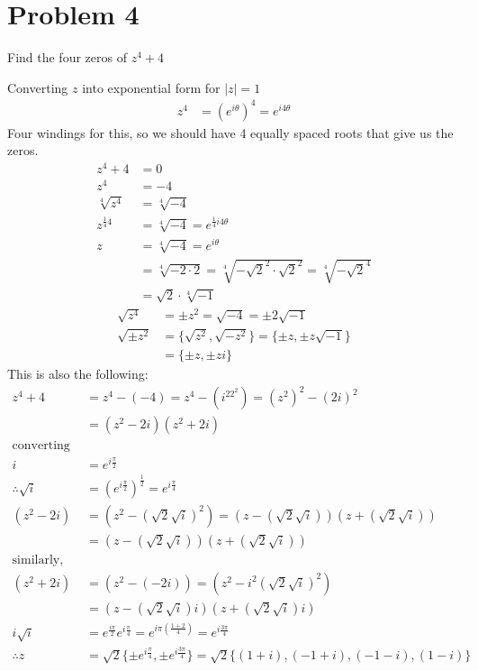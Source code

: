 \documentclass{article}
\begin{document}
\newpage

\section*{Problem 4}
Find the four zeros of $z^4+4$

Converting $z$ into exponential form for $|z| = 1$
 \begin{align*}
 z^4 &= (e^{i\theta})^4 = e^{i4\theta}
 \end{align*}
 Four windings for this, so we should have 4 equally spaced roots that give us the zeros.
 \begin{align*}
   z^4+4 &= 0\\
   z^4 &= -4\\
   \sqrt[4]{z^4} &= \sqrt[4]{-4}\\
   z^{\frac{1}{4}4} &= \sqrt[4]{-4} = e^{\frac{1}{4}i4\theta}\\
   z &= \sqrt[4]{-4} = e^{i\theta}\\
         &= \sqrt[4]{-2\cdot 2} = \sqrt[4]{-\sqrt{2}^2\cdot \sqrt{2}^2} = \sqrt[4]{-\sqrt{2}^4}\\
         &= \sqrt{2}\cdot \sqrt[4]{-1} 
 \end{align*}
 \begin{align*}
   \sqrt{z^4} &= \pm z^2 = \sqrt{-4} = \pm 2\sqrt{-1}\\
   \sqrt{\pm z^2} &= \{\sqrt{z^2}, \sqrt{-z^2}\} = \{\pm z, \pm z\sqrt{-1}\}\\
   &= \{\pm z, \pm zi\}
 \end{align*}
 This is also the following:
 \begin{align*}
   z^4 + 4 &= z^4 - (-4) = z^4 - (i^22^2) = (z^2)^2 - (2i)^2\\
           &=(z^2-2i)(z^2+2i)\\
   \text{converting to exponential}\\
   i &= e^{i\frac{\pi}{2}}\\
   \therefore \sqrt{i} &= (e^{i\frac{\pi}{2}})^{\frac{1}{2}} = e^{i\frac{\pi}{4}}\\
   (z^2-2i) &= (z^2-(\sqrt{2}\sqrt{i})^2) = (z-(\sqrt{2}\sqrt{i}))(z+(\sqrt{2}\sqrt{i}))\\
   &= \boxed{(z-(\sqrt{2}\sqrt{i}))(z+(\sqrt{2}\sqrt{i}))}\\
   \text{similarly, for the positive side}\\
   (z^2+2i) &= (z^2-(-2i)) = (z^2-i^2(\sqrt{2}\sqrt{i})^2)\\
           &= \boxed{(z - (\sqrt{2}\sqrt{i})i)(z+(\sqrt{2}\sqrt{i})i)} \\
   i\sqrt{i} &= e^{\frac{i\pi}{2}}e^{i\frac{\pi}{4}} = e^{i\pi(\frac{1+2}{4})} = e^{i\frac{3\pi}{4}}\\
   \therefore z &=\sqrt{2}\{\pm e^{i\frac{\pi}{4}}, \pm e^{i\frac{3\pi}{4}}\} = \sqrt{2}\{(1+i),(-1+i),(-1-i),(1-i)\}
 \end{align*}
\newpage
\end{document}
